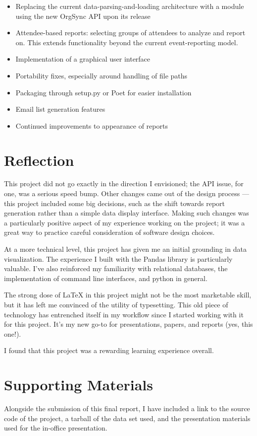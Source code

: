 \documentclass[12pt]{article}
\begin{document}
\begin{itemize}
    \item Replacing the current data-parsing-and-loading architecture with a module using the new OrgSync API upon its release
    \item Attendee-based reports: selecting groups of attendees to analyze and report on.
        This extends functionality beyond the current event-reporting model.
    \item Implementation of a graphical user interface
    \item Portability fixes, especially around handling of file paths
    \item Packaging through setup.py or Poet for easier installation
    \item Email list generation features
    \item Continued improvements to appearance of reports
\end{itemize}


\section*{Reflection}

This project did not go exactly in the direction I envisioned; the API issue, for one, was a serious speed bump.
Other changes came out of the design process --- this project included some big decisions, such as the shift towards report generation rather than a simple data display interface.
Making such changes was a particularly positive aspect of my experience working on the project; it was a great way to practice careful consideration of software design choices.

At a more technical level, this project has given me an initial grounding in data visualization.
The experience I built with the Pandas library is particularly valuable.
I've also reinforced my familiarity with relational databases, the implementation of command line interfaces, and python in general.

The strong dose of LaTeX in this project might not be the most marketable skill, but it has left me convinced of the utility of typesetting.
This old piece of technology has entrenched itself in my workflow since I started working with it for this project.
It's my new go-to for presentations, papers, and reports (yes, this one!).

I found that this  project was a rewarding learning experience overall.

\section*{Supporting Materials}
Alongside the submission of this final report, I have included a link to the source code of the project, a tarball of the data set used, and the presentation materials used for the in-office presentation.

\end{document}
